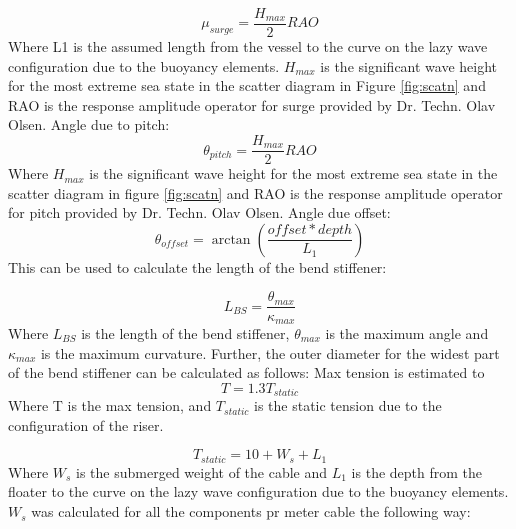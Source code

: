 \begin{equation}
   \mu_{surge} = \frac{H_{max}}{2} RAO
\end{equation}
Where L{1} is the assumed length from the vessel to the curve on the lazy wave configuration due to the buoyancy elements.  $H_{max}$ is the significant wave height for the most extreme sea state in the scatter diagram in Figure \ref{fig:scatn} and RAO is the response amplitude operator for surge provided by Dr. Techn. Olav Olsen. \newline
\newline 
\noindent Angle due to pitch:
\begin{equation}
   \theta_{pitch} = \frac{H_{max}}{2} RAO
\end{equation}
Where $H_{max}$ is the significant wave height for the most extreme sea state in the scatter diagram in figure \ref{fig:scatn} and RAO is the response amplitude operator for pitch provided by Dr. Techn. Olav Olsen. \newline
\newline
Angle due offset:
\begin{equation}
   \theta_{offset} = \arctan{(\frac{offset * depth}{L_1})}
\end{equation}
This can be used to calculate the length of the bend stiffener:

\begin{equation}
   L_{BS} = \frac{\theta_{max}}{\kappa_{max}} 
  \end{equation}
Where $L_{BS}$ is the length of the bend stiffener, $\theta_{max}$ is the maximum angle and $\kappa_{max}$ is the maximum curvature. \newline
\newline
Further, the outer diameter for the widest part of the bend stiffener can be calculated as follows: \newline
\newline 
Max tension is estimated to 
\begin{equation}
   T = 1.3  T_{static}
\end{equation}
Where T is the max tension, and $T_{static}$ is the static tension due to the configuration of the riser.

\begin{equation}
   T_{static} = 10 + W_s + L_1
\end{equation}
Where $W_s$ is the submerged weight of the cable and $L_1$ is the depth from the floater to the curve on the lazy wave configuration due to the buoyancy elements.\newline
\newline
\noindent $W_s$ was calculated for all the components pr meter cable the following way:

